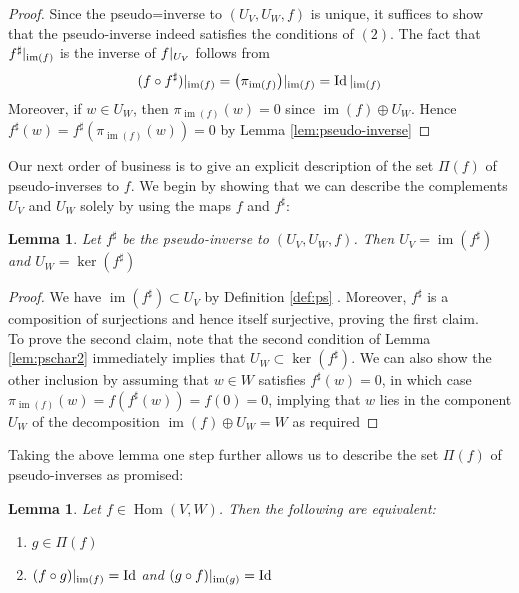 \documentclass{book}
\theoremstyle{plain}
\newtheorem{lemma}[corollary]{Lemma}
\theoremstyle{definition}
\newcommand{\ds}{\oplus}
\DeclareMathOperator{\Hom}{Hom}
\DeclareMathOperator{\Id}{Id}
\DeclareMathOperator{\im}{im}
\begin{document}
\begin{proof}
	Since the pseudo=inverse to $(U_V,U_W,f)$ is unique, it suffices to show that the pseudo-inverse indeed satisfies the conditions of $(2)$. The fact that $f^\sharp\arrowvert_{\im(f)}$ is the inverse of $f\arrowvert_{U_V}$ follows from 
	\[
	(f\circ f^\sharp) \arrowvert_{\im(f)}=\big(\pi_{\im(f)}\big)\arrowvert_{\im(f)}=\Id\arrowvert_{\im(f)}
\] 
Moreover, if $w \in U_W$, then $\pi_{\im(f)}(w)=0$ since $\im(f)\ds U_W$. Hence $f^\sharp(w)=f^\sharp(\pi_{\im(f)}(w))=0$ by Lemma \ref{lem:pseudo-inverse}
\end{proof}
Our next order of business is to give an explicit description of the set $\Pi(f)$ of pseudo-inverses to $f$. We begin by showing that we can describe the complements $U_V$ and $U_W$ solely by using the maps $f$ and $f^\sharp$:
\begin{lemma}\label{lem:psim-ker}
	Let $f^\sharp$ be the pseudo-inverse to $(U_V,U_W,f)$. Then $U_V=\im(f^\sharp)$ and $U_W=\ker(f^\sharp)$
\end{lemma}

\begin{proof}
	We have $\im(f^\sharp)\subset U_V$ by Definition \ref{def:ps} . Moreover, $f^\sharp$ is a composition of surjections and hence itself surjective, proving the first claim.\\
	To prove the second claim, note that the second condition of Lemma \ref{lem:pschar2} immediately implies that $U_W\subset \ker(f^\sharp)$. We can also show the other inclusion by assuming that $w\in W$ satisfies $f^\sharp(w)=0$, in which case $\pi_{\im(f)}(w)=f(f^\sharp(w))=f(0)=0$, implying that $w$ lies in the component $U_W$ of the decomposition $\im(f)\ds U_W=W$ as required
\end{proof}

Taking the above lemma one step further allows us to describe the set $\Pi(f)$ of pseudo-inverses as promised:

\begin{lemma}\label{lem:charpi}
	Let $f \in \Hom(V,W)$. Then the following are equivalent:
	\begin{enumerate}
	\item $g \in \Pi(f)$
	\item $(f\circ g)\arrowvert_{\im(f)}=\Id$ and $(g\circ f)\arrowvert_{\im(g)}=\Id$ 
	\end{enumerate}
\end{lemma}
\end{document}
